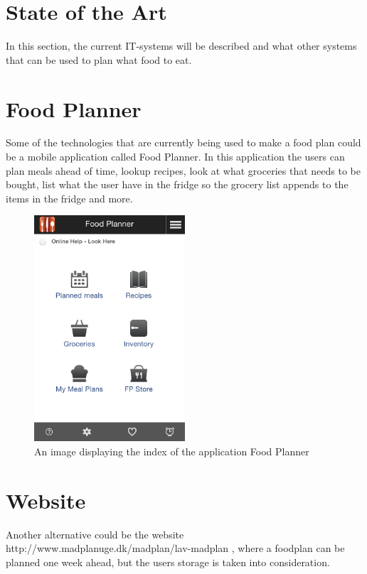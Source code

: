 \section{State of the Art}
In this section, the current IT-systems will be described and what other systems that can be used to plan what food to eat.

\section{Food Planner}
Some of the technologies that are currently being used to make a food plan could be a mobile application called Food Planner.
In this application the users can plan meals ahead of time, lookup recipes, look at what groceries that needs to be bought,
list what the user have in the fridge so the grocery list appends to the items in the fridge and more.

\begin{figure}[H]
    \centering
    \includegraphics[width=0.5\textwidth]{Grafik/FoodPlanner/index}
    \caption{An image displaying the index of the application Food Planner}
    \label{FoodPlannerIndex}
\end{figure}


\section{Website}
Another alternative could be the website http://www.madplanuge.dk/madplan/lav-madplan 
, where a foodplan can be planned one week ahead, but the users storage is taken into consideration.

